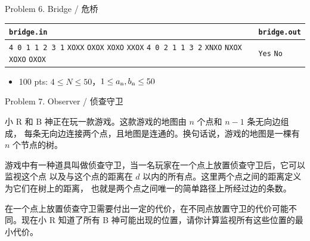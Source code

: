 \documentclass[UTF8]{beamer}
\begin{document}
\begin{frame}{Problem 6. Bridge / 危桥}

\begin{tabularx}{\textwidth}{|X|X|}
\hline
\texttt{\textbf{bridge.in}} & \texttt{\textbf{bridge.out}} \\ \hline
\texttt{4 0 1 1 2 3 1}\newline
\texttt{XOXX}\newline
\texttt{OXOX}\newline
\texttt{XOXO}\newline
\texttt{XXOX}\newline
\texttt{4 0 2 1 1 3 2}\newline
\texttt{XNXO}\newline
\texttt{NXOX}\newline
\texttt{XOXO}\newline
\texttt{OXOX}
&
\texttt{Yes}\newline
\texttt{No}
\\ \hline
\end{tabularx}
\newline
\begin{itemize}
    \item 100 pts: $4 \leq N \leq 50$，$1 \leq a_{\rm n}, b_{\rm n} \leq 50$
\end{itemize}

\end{frame}


\begin{frame}{Problem 7. Observer / 侦查守卫}

小 R 和 B 神正在玩一款游戏。这款游戏的地图由 $n$ 个点和 $n - 1$ 条无向边组成，
每条无向边连接两个点，且地图是连通的。换句话说，游戏的地图是一棵有 $n$ 个节点的树。

游戏中有一种道具叫做侦查守卫，当一名玩家在一个点上放置侦查守卫后，它可以监视这个点
以及与这个点的距离在 $d$ 以内的所有点。这里两个点之间的距离定义为它们在树上的距离，
也就是两个点之间唯一的简单路径上所经过边的条数。

在一个点上放置侦查守卫需要付出一定的代价，在不同点放置守卫的代价可能不同。现在小 R
知道了所有 B 神可能出现的位置，请你计算监视所有这些位置的最小代价。

\end{frame}
\end{document}
